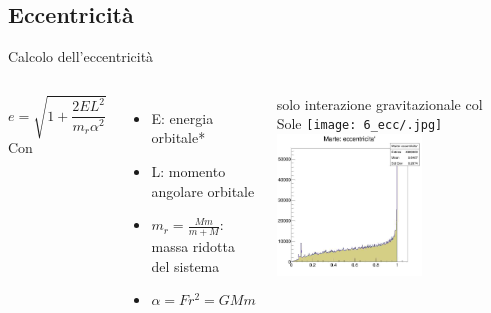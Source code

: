    \subsection{Eccentricità}
        \begin{frame}{Calcolo dell'eccentricità}
            \begin{columns}
                    \begin{equation}
                        e = \sqrt{1+\frac{2EL^2}{m_r\alpha^2}}
                    \end{equation}
                    Con
                    \begin{itemize}
                        \item E: energia orbitale*
                        \item L: momento angolare orbitale
                        \item $m_r=\frac{Mm}{m+M}$: massa ridotta del sistema
                        \item $\alpha = F r^2 = GMm$
                    \end{itemize}
                    \small *solo interazione gravitazionale col Sole
                    \centering
                    \texttt{[image: 6\_ecc/.jpg]}
                    \includegraphics[width=.9\textwidth, height=3.75cm]{6_ecc/mar_ecc_bug.jpg}
                    \label{cfr::bug} 
            \end{columns}
        \end{frame}
